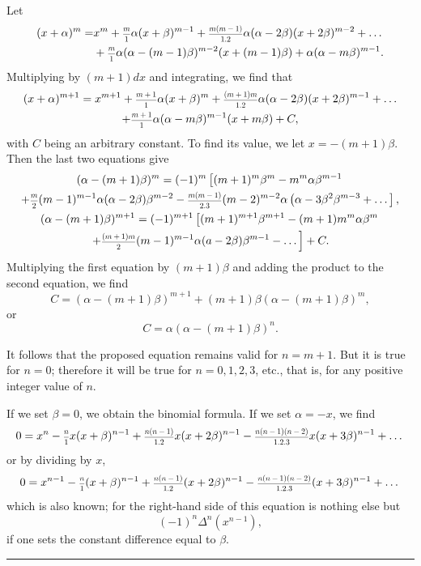 \documentclass[oneside, 12 pt, leqno]{memoir}
\let\oldfrac\frac
\def\frac#1#2{\mathchoice{\text{\scalebox{.83}{${\oldfrac{#1}{#2}}$}}}{\text{\scalebox{.83}{${\displaystyle\oldfrac{#1}{#2}}$}}}{\genfrac{}{}{}{2}{#1}{#2}}{\genfrac{}{}{}{3}{#1}{#2}}}
\begin{document}
Let
\[\begin{aligned}
(x+\alpha)^m=&x^m+\frac{m}{1} \alpha(x+\beta)^{m-1}+\frac{m(m-1)}{1.2} \alpha(\alpha-2 \beta)(x+2 \beta)^{m-2}+\dots \\
&+\frac{m}{1} \alpha(\alpha-(m-1) \beta)^{m-2}(x+(m-1) \beta)+\alpha(\alpha-m \beta)^{m-1}.
\end{aligned}\]
Multiplying by \((m+1) d x\) and integrating, we find that
\[\begin{gathered}
(x+\alpha)^{m+1}=x^{m+1}+\frac{m+1}{1} \alpha(x+\beta)^m+\frac{(m+1) m}{1.2} \alpha(\alpha-2 \beta)(x+2 \beta)^{m-1}+\dots \\
+\frac{m+1}{1} \alpha(\alpha-m \beta)^{m-1}(x+m \beta)+C,
\end{gathered}\]
with \(C\) being an arbitrary constant. To find its value, we let \(x=-(m+1) {\beta}\). Then the last two equations give
\[\begin{gathered}
(\alpha-(m+1) \beta)^m=(-1)^m\left[(m+1)^m \beta^m-m^m \alpha \beta^{m-1}\right. \\
+\frac{m}{2}(m-1)^{m-1} \alpha(\alpha-2 \beta) \beta^{m-2}-\frac{m(m-1)}{2.3}(m-2)^{m-2} \alpha\left(\alpha-3 \beta^2 \beta^{m-3}+\dots\right], \\
(\alpha-(m+1) \beta)^{m+1}=(-1)^{m+1}\left[(m+1)^{m+1} \beta^{m+1}-(m+1) m^m \alpha \beta^m\right. \\
\left.+\frac{(m+1) m}{2}(m-1)^{m-1} \alpha(a-2 \beta) \beta^{m-1}-\dots\right]+C.
\end{gathered}\]
Multiplying the first equation by \((m+1) {\beta}\) and adding the product to the second equation, we find
\[C=(\alpha-(m+1) \beta)^{m+1}+(m+1) \beta(\alpha-(m+1) \beta)^m,\]
or
\[C=\alpha(\alpha-(m+1) \beta)^n.\]

It follows that the proposed equation remains valid for \(n=m+1\). But it is true for \(n=0\); therefore it will be true for \(n=0,1,2,3\), etc., that is, for any positive integer value of \(n\).

If we set \(\beta=0\), we obtain the binomial formula. If we set \(\alpha=-x\), we find
\[0=x^n-\frac{n}{1} x(x+\beta)^{n-1} +\frac{n(n-1)}{1.2} x(x+2 \beta)^{n-1} -\frac{n(n-1)(n-2)}{1.2.3} x(x+3 \beta)^{n-1}+\dots\]
or by dividing by \(x\),
\[0=x^{n-1}-\frac{n}{1}(x+\beta)^{n-1} +\frac{n(n-1)}{1.2}(x+2 \beta)^{n-1} -\frac{n(n-1)(n-2)}{1.2.3}(x+3 \beta)^{n-1}+\dots\]
which is also known; for the right-hand side of this equation is nothing else but
\[(-1)^n \Delta^n\left(x^{n-1}\right),\]
if one sets the constant difference equal to \({\beta}\).
\begin{center}
\rule{2in}{0.1pt}
\end{center}
\vfill
\end{document}
